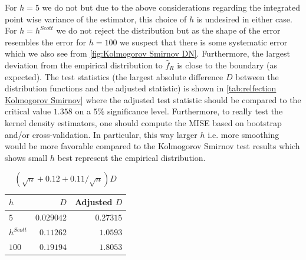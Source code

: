 \documentclass[../Thesis.tex]{subfiles}
\begin{document}
For $h=5$ we do not but due to the above considerations regarding the integrated point wise variance of the estimator, this choice of $h$ is undesired in either case. For $h = h^{Scott}$ we do not reject the distribution but as the shape of the error resembles the error for $h=100$ we suspect that there is some systematic error which we also see from \autoref{fig:Kolmogorov Smirnov DN}. Furthermore, the largest deviation from the empirical distribution to $\hat{f}_R$ is close to the boundary (as expected). The test statistics (the largest absolute difference $D$ between the distribution functions and the adjusted statistic) is shown in \autoref{tab:relfection Kolmogorov Smirnov} where the adjusted test statistic should be compared to the critical value $1.358$ on a $5\%$ significance level. Furthermore, to really test the kernel density estimators, one should compute the MISE based on bootstrap and/or cross-validation. In particular, this way larger $h$ i.e. more smoothing would be more favorable compared to the Kolmogorov Smirnov test results which shows small $h$ best represent the empirical distribution.
\begin{table}[ht]
    \centering
    \begin{tabular}{l|rr}
        $h$         & $D$        & Adjusted $D$ \\\hline
        $5$         & $0.029042$ & $0.27315$    \\
        $h^{Scott}$ & $0.11262$  & $1.0593$     \\
        $100$       & $0.19194$  & $1.8053$
    \end{tabular}
    \caption{$\left(\sqrt{n} + 0.12 + 0.11/\sqrt{n}\right) D$}
    \label{tab:relfection Kolmogorov Smirnov}
\end{table}
\end{document}

